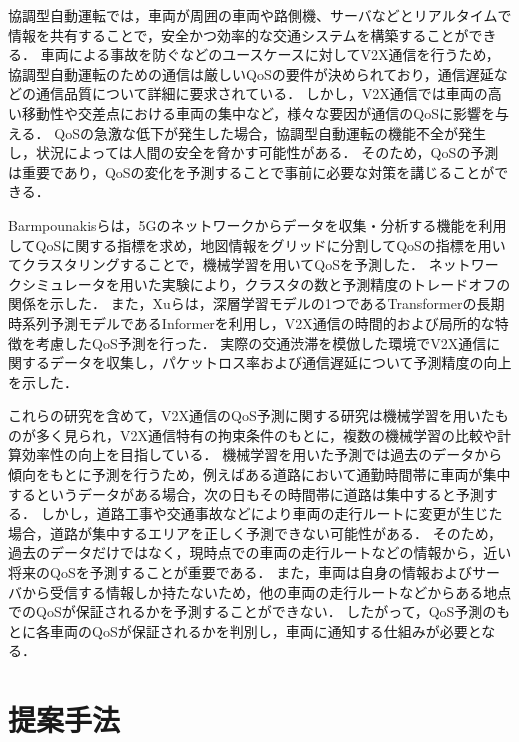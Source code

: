 \documentclass[a4paper,11pt,uplatex]{ujreport}
\begin{document}
  協調型自動運転では，車両が周囲の車両や路側機、サーバなどとリアルタイムで情報を共有することで，安全かつ効率的な交通システムを構築することができる．
  車両による事故を防ぐなどのユースケースに対してV2X通信を行うため，協調型自動運転のための通信は厳しいQoSの要件が決められており，通信遅延などの通信品質について詳細に要求されている\cite{5GAA}．
  しかし，V2X通信では車両の高い移動性や交差点における車両の集中など，様々な要因が通信のQoSに影響を与える\cite{cause}．
  QoSの急激な低下が発生した場合，協調型自動運転の機能不全が発生し，状況によっては人間の安全を脅かす可能性がある\cite{danger}．
  そのため，QoSの予測は重要であり，QoSの変化を予測することで事前に必要な対策を講じることができる．\par
  Barmpounakisらは，5Gのネットワークからデータを収集・分析する機能を利用してQoSに関する指標を求め，地図情報をグリッドに分割してQoSの指標を用いてクラスタリングすることで，機械学習を用いてQoSを予測した\cite{AI}．
  ネットワークシミュレータを用いた実験により，クラスタの数と予測精度のトレードオフの関係を示した．
  また，Xuらは，深層学習モデルの1つであるTransformer\cite{Transformer}の長期時系列予測モデルであるInformer\cite{Informer}を利用し，V2X通信の時間的および局所的な特徴を考慮したQoS予測を行った\cite{Informer-based}．
  実際の交通渋滞を模倣した環境でV2X通信に関するデータを収集し，パケットロス率および通信遅延について予測精度の向上を示した．\par
  これらの研究を含めて，V2X通信のQoS予測に関する研究は機械学習を用いたものが多く見られ，V2X通信特有の拘束条件のもとに，複数の機械学習の比較や計算効率性の向上を目指している．
  機械学習を用いた予測では過去のデータから傾向をもとに予測を行うため，例えばある道路において通勤時間帯に車両が集中するというデータがある場合，次の日もその時間帯に道路は集中すると予測する．
  しかし，道路工事や交通事故などにより車両の走行ルートに変更が生じた場合，道路が集中するエリアを正しく予測できない可能性がある．
  そのため，過去のデータだけではなく，現時点での車両の走行ルートなどの情報から，近い将来のQoSを予測することが重要である．
  また，車両は自身の情報およびサーバから受信する情報しか持たないため，他の車両の走行ルートなどからある地点でのQoSが保証されるかを予測することができない．
  したがって，QoS予測のもとに各車両のQoSが保証されるかを判別し，車両に通知する仕組みが必要となる．

\chapter{提案手法}
\label{chap:提案手法}
\end{document}
